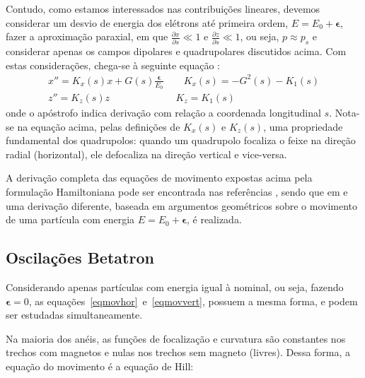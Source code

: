 Contudo, como estamos interessados nas contribuições lineares, devemos considerar um desvio de energia dos elétrons até primeira ordem, $E=E_0+\boldsymbol{\epsilon}$, fazer a aproximação paraxial, em que
$\frac{\partial x}{\partial s}\ll 1$ e $\frac{\partial z}{\partial s} \ll 1$, ou seja, $p\approx p_s$ e considerar apenas os campos dipolares e quadrupolares discutidos acima. Com estas considerações, chega-se à seguinte equação \cite{Wiedemann3, Lee, Sands}:
\begin{align}
\label{eq:movhor}
 & x'' = K_x(s)x+G(s)\frac{\boldsymbol{\epsilon}}{E_0} \qquad
K_x(s)=-G^2(s)-K_1(s) &\\
\label{eq:movvert}
 & z'' = K_z(s)z \qquad \qquad \qquad \,\,\,\, K_z = K_1(s) &
\end{align}
onde o apóstrofo indica derivação com relação a coordenada longitudinal $s$. Nota-se na equação acima, pelas definições de $K_x(s)$ e $K_z(s)$, uma propriedade fundamental dos quadrupolos: quando um quadrupolo focaliza o feixe na direção radial (horizontal), ele defocaliza na direção vertical e vice-versa.

A derivação completa das equações de movimento expostas acima pela formulação Hamiltoniana pode ser encontrada nas referências \cite{Lee, Wiedemann3}, sendo que em \cite{Sands} e \cite{Wiedemann3} uma derivação diferente, baseada em argumentos geométricos sobre o movimento de uma partícula com energia
$E=E_0+\boldsymbol{\epsilon}$, é realizada.


\subsection{Oscilações Betatron}

Considerando apenas partículas com energia igual à nominal, ou seja, fazendo $\boldsymbol{\epsilon} = 0$, as \mbox{equações~\ref{eqmovhor} e \ref{eqmovvert}}, possuem a mesma forma, e podem ser estudadas simultaneamente.

Na maioria dos anéis, as funções de focalização e curvatura são constantes nos trechos com magnetos e nulas nos trechos sem magneto (livres). Dessa forma, a equação do movimento é a equação de Hill:

